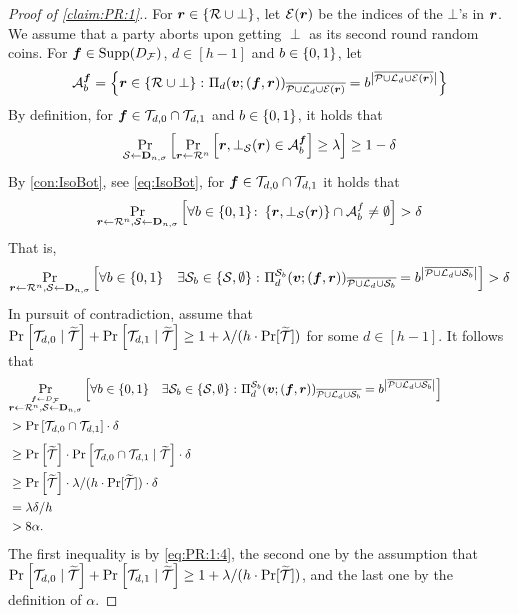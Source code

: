 \begin{proof}[Proof of \cref{claim:PR:1}.]
For ${ \boldsymbol{r}} \in \left\{\mathcal{R} \cup \bot\right\}$, let $ \mathcal{E}({ \boldsymbol{r}})$ be the indices of the $\bot$'s in ${ \boldsymbol{r}}$.
We  assume \wlg that a party aborts upon  getting $\perp$ as its second round random coins. For ${ \boldsymbol{f}} \in \operatorname{Supp}(D_{\cal F})$, $d\in [h-1]$ and $b \in \{0,1\}$, let
\begin{align}
\mathcal{A}^{ \boldsymbol{f}}_b = \left\{{ \boldsymbol{r}} \in \left\{\mathcal{R} \cup \bot\right\} \colon \Pi_d({ \boldsymbol{v}};({ \boldsymbol{f}},{ \boldsymbol{r}}))_{\overline{\mathcal{P} \cup {\cal{L}}_d \cup \mathcal{E}({ \boldsymbol{r}})}} = b^{\left|\overline{\mathcal{P} \cup {\cal{L}}_d \cup \mathcal{E}({ \boldsymbol{r}})}\right|}\right\}
\end{align}
By definition,  for ${ \boldsymbol{f}} \in \mathcal{T}_{d,0} \cap \mathcal{T}_{d,1}$ and  $b\in \{0,1\}$, it holds that
\begin{align}
\Pr_{{\cal{S}}\gets \mathbf{D}_{n,\sigma}}\left[\Pr_{{ \boldsymbol{r}} \gets \mathcal{R}^n}\left[{ \boldsymbol{r}},\bot_{\mathcal{S}}({ \boldsymbol{r}}) \in \mathcal{A}^{ \boldsymbol{f}}_b\right] \ge \lambda\right] \ge 1-\delta
\end{align}
By \cref{con:IsoBot},   see  \cref{eq:IsoBot}, for  ${ \boldsymbol{f}} \in \mathcal{T}_{d,0} \cap \mathcal{T}_{d,1}$ it holds that
\begin{align*}%
\ppr{\vr\gets \rn,\cS \gets \bns}{\forall \o \in \zo \colon \set{\vr,\bot_{\cS}(\vr)}\cap \cA^f_b \neq \emptyset} > \delta
\end{align*}
That is,
\begin{align}\label{eq:PR:1:4}
\Pr_{{ \boldsymbol{r}}\gets \mathcal{R}^n,\mathcal{S} \gets \mathbf{D}_{n,\sigma}}\left[\forall b\in \{0,1\}  \quad \exists {\cal{S}}_b \in \left\{{\cal{S}},\emptyset\right\} \colon  \Pi^{\mathcal{S}_b}_{d}({ \boldsymbol{v}};({ \boldsymbol{f}},{ \boldsymbol{r}}))_{ \overline{\mathcal{P} \cup {\cal{L}}_d \cup\mathcal{S}_b} }= b^{ \left|\overline{ \mathcal{P} \cup {\cal{L}}_d \cup\mathcal{S}_b}\right|}\right] >\delta
\end{align}
In pursuit of contradiction, assume that $\Pr_{}\left[\mathcal{T}_{d,0} \mid {\widetilde{\mathcal{T}}}\right]  + \Pr_{}\left[\mathcal{T}_{d,1} \mid {\widetilde{\mathcal{T}}}\right]  \ge 1 +  \lambda/(h\cdot \Pr[{\widetilde{\mathcal{T}}}])$ for  some $d \in [h-1]$. It follows that
\begin{align}\label{eq:PR:1:5}
\lefteqn{\ppr{\stackrel{\vf \gets \DF}{\vr\gets \cR^n,\cS \gets \bns}}{\forall \o\in \zo  \quad \exists  \cs_\o \in \set{\cs,\emptyset}\colon  \Pi^{ \cs_\o}_{d}(\vv;(\vf,\vr))_{ \overline{\cP \cup \cL_d \cup \cs_\o} }= \o^{ \size{\overline{ \cP \cup \cL_d \cup \cs_\o}}}}}\\
&> \pr{\cT_{d,0} \cap \cT_{d,1}}\cdot \delta  \hskip30em \nonumber\\
&\ge \pr{\tT}\cdot  \pr{\cT_{d,0} \cap \cT_{d,1} \mid \tT} \cdot \delta  \nonumber\\
&\ge \pr{\tT}\cdot   \lambda/(h\cdot \Pr[\tT]) \cdot \delta  \nonumber\\
&= \lambda\delta /h  \nonumber\\
&> 8\alpha.\nonumber
\end{align}
The first inequality is by \cref{eq:PR:1:4}, the second one by the assumption that  $\Pr_{}\left[\mathcal{T}_{d,0} \mid {\widetilde{\mathcal{T}}}\right]  + \Pr_{}\left[\mathcal{T}_{d,1} \mid {\widetilde{\mathcal{T}}}\right]  \ge  1 +  \lambda/(h\cdot \Pr[{\widetilde{\mathcal{T}}}])$, and the last one by the definition of $\alpha$.


\end{proof}
